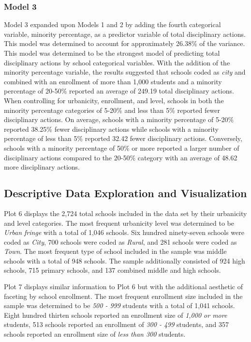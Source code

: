 \documentclass[man]{apa6}
\begin{document}
\hypertarget{model-3}{%
\subsubsection{Model 3}\label{model-3}}

Model 3 expanded upon Models 1 and 2 by adding the fourth categorical variable, minority percentage, as a predictor variable of total disciplinary actions. This model was determined to account for approximately 26.38\% of the variance. This model was determined to be the strongest model of predicting total disciplinary actions by school categorical variables. With the addition of the minority percentage variable, the results suggested that schools coded as \emph{city} and combined with an enrollment of more than 1,000 students and a minority percentage of 20-50\% reported an average of 249.19 total disciplinary actions. When controlling for urbanicity, enrollment, and level, schools in both the minority percentage categories of 5-20\% and less than 5\% reported fewer disciplinary actions. On average, schools with a minority percentage of 5-20\% reported 38.25\% fewer disciplinary actions while schools with a minority percentage of less than 5\% reported 32.42 fewer disciplinary actions. Conversely, schools with a minority percentage of 50\% or more reported a larger number of disciplinary actions compared to the 20-50\% category with an average of 48.62 more disciplinary actions.

\hypertarget{descriptive-data-exploration-and-visualization-1}{%
\subsection{Descriptive Data Exploration and Visualization}\label{descriptive-data-exploration-and-visualization-1}}

Plot 6 displays the 2,724 total schools included in the data set by their urbanicity and level categories. The most frequent urbanicity level was determined to be \emph{Urban fringe} with a total of 1,046 schools. Six hundred ninety-seven schools were coded as \emph{City}, 700 schools were coded as \emph{Rural}, and 281 schools were coded as \emph{Town}. The most frequent type of school included in the sample was middle schools with a total of 948 schools. The sample additionally consisted of 924 high schools, 715 primary schools, and 137 combined middle and high schools.

Plot 7 displays similar information to Plot 6 but with the additional aesthetic of faceting by school enrollment. The most frequent enrollment size included in the sample was determined to be \emph{500 - 999} students with a total of 1,041 schools. Eight hundred thirten schools reported an enrollment size of \emph{1,000 or more} students, 513 schools reported an enrollment of \emph{300 - 499} students, and 357 schools reported an enrollment size of \emph{less than 300} students.
\end{document}
